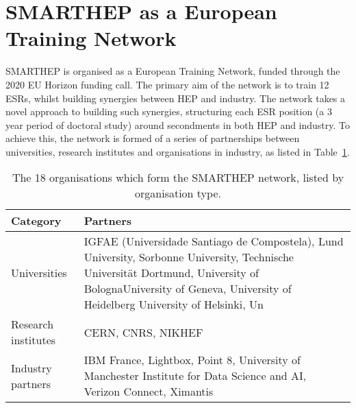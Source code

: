 \section{SMARTHEP as a European Training Network}
\label{network}
SMARTHEP is organised as a European Training Network, funded through the 2020 EU Horizon funding call. The primary aim of the network is to train 12 ESRs, whilst building synergies between HEP and industry. The network takes a novel approach to building such synergies, structuring each ESR position (a 3 year period of doctoral study) around secondments in both HEP and industry. To achieve this, the network is formed of a series of partnerships between universities, research institutes and organisations in industry, as listed in Table~\ref{partners}.

\begin{table}[h!]
    \centering
    \caption{The 18 organisations which form the SMARTHEP network, listed by organisation type.}
    \label{partners}       
    \begin{tabular}{p{3cm}p{8.5cm}}
    \hline
    Category & Partners \\\hline
    Universities        & IGFAE (Universidade Santiago de Compostela), Lund University, Sorbonne University, Technische Universit\"at Dortmund, University of BolognaUniversity of Geneva, University of Heidelberg University of Helsinki, Un \\
    Research institutes & CERN, CNRS, NIKHEF  \\
    Industry partners   & IBM France, Lightbox, Point 8, University of Manchester Institute for Data Science and AI, Verizon Connect, Ximantis\\\hline
    \end{tabular}
\end{table}

